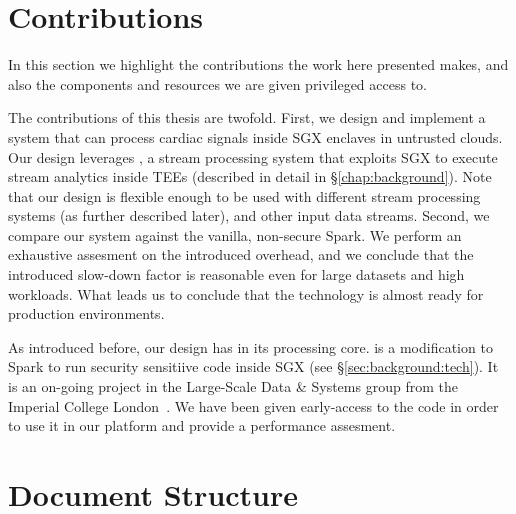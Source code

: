 \section{Contributions}

In this section we highlight the contributions the work here presented makes, and also the components and resources we are given privileged access to.

The contributions of this thesis are twofold.
First, we design and implement a system that can process cardiac signals inside SGX enclaves in untrusted clouds.
Our design leverages \sgxspark, a stream processing system that exploits SGX to execute stream analytics inside TEEs (described in detail in \S\ref{chap:background}).
Note that our design is flexible enough to be used with different stream processing systems (as further described later), and other input data streams.
Second, we compare our system against the vanilla, non-secure Spark.
We perform an exhaustive assesment on the introduced overhead, and we conclude that the introduced slow-down factor is reasonable even for large datasets and high workloads.
What leads us to conclude that the technology is almost ready for production environments.

As introduced before, our design has \sgxspark in its processing core.
\sgxspark is a modification to Spark to run security sensitiive code inside SGX (see \S\ref{sec:background:tech}).
It is an on-going project in the Large-Scale Data \& Systems group from the Imperial College London~\cite{lsds}.
We have been given early-access to the code in order to use it in our platform and provide a performance assesment.

\section{Document Structure}

